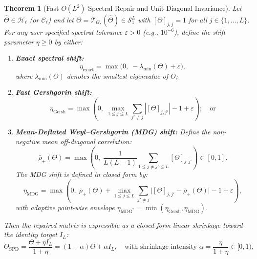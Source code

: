 \documentclass[default,sn-mathphys,Numbered]{sn-jnl}
\theoremstyle{thmstyleone}
\newtheorem{theorem}{Theorem}
\theoremstyle{thmstylethree}
\theoremstyle{thmstyletwo}
\begin{document}
\begin{theorem}[Fast $O(L^2)$ Spectral Repair and Unit-Diagonal Invariance]
\label{th:reg_spd}\label{prop:reg_spd}
Let $\hat{\Theta} \in \mathcal{H}_\ell$ (or $\mathcal{C}_\ell$) and let $\Theta = \mathcal{T}_{G_*}(\hat{\Theta}) \in \mathcal{S}_1^L$ with $[\Theta]_{j, j} = 1$ for all $j \in \{1, \ldots, L\}$. For any user-specified spectral tolerance $\varepsilon > 0$ (\textit{e.g.}, $10^{-6}$), define the shift parameter $\eta \ge 0$ by either:
\begin{enumerate}
    \item \textbf{Exact spectral shift:}
    \begin{equation}
    \label{eq:eta_exact}
    \eta_{\mathrm{exact}} = \max\bigl(0,\; -\lambda_{\min}(\Theta) + \varepsilon\bigr),
    \end{equation}
    where $\lambda_{\min}(\Theta)$ denotes the smallest eigenvalue of $\Theta$;
    \item \textbf{Fast Gershgorin shift:}
    \begin{equation}
    \label{eq:eta_gersh}
    \eta_{\mathrm{Gersh}} = \max\left(0,\; \max_{1 \le j \le L} \sum_{j' \neq j} |[\Theta]_{j, j'}| - 1 + \varepsilon\right); \quad \text{or}
    \end{equation}
    \item \textbf{Mean-Deflated Weyl--Gershgorin (MDG) shift:} Define the non-negative mean off-diagonal correlation:
    \begin{equation}
    \label{eq:mean_rho_plus}
    \bar{\rho}_+(\Theta) = \max\left(0,\; \frac{1}{L(L-1)} \sum_{1 \le j \neq j' \le L} [\Theta]_{j, j'}\right) \in [0, 1].
    \end{equation}
    The MDG shift is defined in closed form by:
    \begin{equation}
    \label{eq:eta_mdg}
    \eta_{\mathrm{MDG}} = \max\left(0,\; \bar{\rho}_+(\Theta) + \max_{1 \le j \le L} \sum_{j' \neq j} \big|[\Theta]_{j, j'} - \bar{\rho}_+(\Theta)\big| - 1 + \varepsilon\right),
    \end{equation}
    with adaptive point-wise envelope $\eta_{\mathrm{MDG}^*} = \min(\eta_{\mathrm{Gersh}}, \eta_{\mathrm{MDG}})$.
\end{enumerate}
Then the repaired matrix is expressible as a closed-form linear shrinkage toward the identity target $I_L$:
\begin{equation}
\label{eq:regularization}
\Theta_{\mathrm{SPD}} = \frac{\Theta + \eta I_L}{1 + \eta} = (1 - \alpha) \Theta + \alpha I_L, \quad \text{with shrinkage intensity } \alpha = \frac{\eta}{1 + \eta} \in [0, 1),

\end{equation}
\end{theorem}
\end{document}
